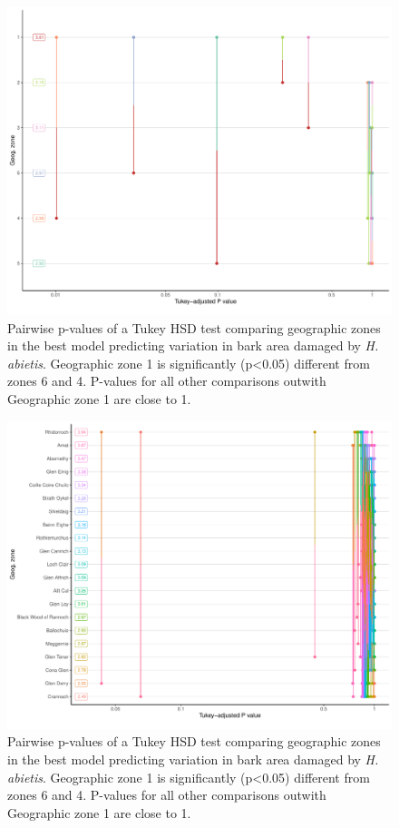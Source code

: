 \documentclass[a4paper, 11pt]{article}
\begin{document}
\begin{figure}
	\includegraphics[width=\textwidth]{tukey_lmer_geog}
	\caption{Pairwise p-values of a Tukey HSD test comparing geographic zones in the best model predicting variation in bark area damaged by \textit{H. abietis}. Geographic zone 1 is significantly (p\textless{}0.05) different from zones 6 and 4. P-values for all other comparisons outwith Geographic zone 1 are close to 1.}
\end{figure}

\begin{figure}
	\includegraphics[width=\textwidth]{tukey_lmer_site}
	\caption{Pairwise p-values of a Tukey HSD test comparing geographic zones in the best model predicting variation in bark area damaged by \textit{H. abietis}. Geographic zone 1 is significantly (p\textless{}0.05) different from zones 6 and 4. P-values for all other comparisons outwith Geographic zone 1 are close to 1.}
\end{figure}
\end{document}
